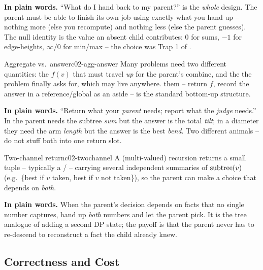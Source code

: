 \noindent\textbf{In plain words.} ``What do I hand back to my parent?'' is the
\emph{whole} design. The parent must be able to finish its own job using exactly
what you hand up -- nothing more (else you recompute) and nothing less (else the
parent guesses). The null identity is the value an absent child contributes: $0$
for sums, $-1$ for edge-heights, $\infty$/$0$ for min/max -- the choice was
Trap 1 of .

\begin{definition}{Aggregate vs.\ answer}{c02-agg-answer}
Many problems need two different quantities: the  $f(v)$ that
must travel \emph{up} for the parent's combine, and the  the
problem finally asks for, which may live anywhere.  them --
return $f$, record the answer in a reference/global as an aside -- is the
standard bottom-up structure.
\end{definition}

\noindent\textbf{In plain words.} ``Return what your \emph{parent} needs; report
what the \emph{judge} needs.'' In  the parent needs the subtree
\emph{sum} but the answer is the total \emph{tilt}; in a diameter they need the
arm \emph{length} but the answer is the best \emph{bend}. Two different animals --
do not stuff both into one return slot.

\begin{definition}{Two-channel return}{c02-twochannel}
A  (multi-valued) recursion returns a small tuple -- typically
a / -- carrying several independent summaries of
$\operatorname{subtree}(v)$ (e.g.\ \{best if $v$ taken, best if $v$ not taken\}), so the
parent can make a choice that depends on \emph{both}.
\end{definition}

\noindent\textbf{In plain words.} When the parent's decision depends on facts
that no single number captures, hand up \emph{both} numbers and let the parent
pick. It is the tree analogue of adding a second DP state; the payoff is that the
parent never has to re-descend to reconstruct a fact the child already knew.

\subsection{Correctness and Cost}

